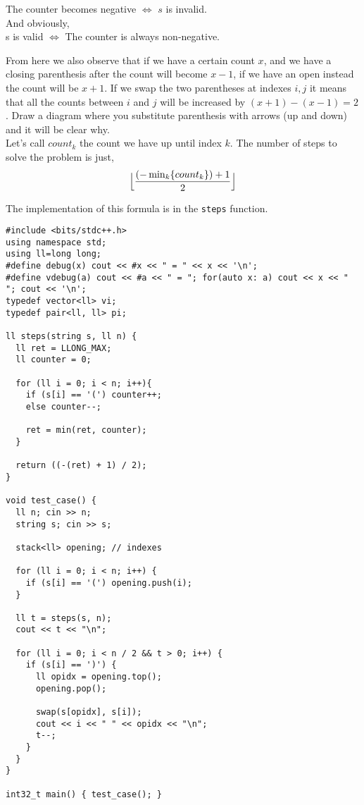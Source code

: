 \begin{obs}
    The counter becomes negative $\iff$ $s$ is invalid. \\
    And obviously, \\
    s is valid $\iff$ The counter is always non-negative.
\end{obs}

From here we also observe that if we have a certain count $x$, and we have a closing parenthesis after the count will become $x-1$, if we have an open instead the count will be $x + 1$. If we swap the two parentheses at indexes $i, j$ it means that all the counts between $i$ and $j$ will be increased by $(x + 1) - (x - 1)  = 2$. Draw a diagram where you substitute parenthesis with arrows (up and down) and it will be clear why.
\\
Let's call $count_k$ the count we have up until index $k$. The number of steps to solve the problem is just,
\begin{equation}
    \Bigl\lfloor \frac{ (- \min_{k}\{count_k\}) + 1}{2} \Bigr\rfloor
\end{equation}

The implementation of this formula is in the \texttt{steps} function.

\begin{verbatim}
#include <bits/stdc++.h>
using namespace std;
using ll=long long;
#define debug(x) cout << #x << " = " << x << '\n';
#define vdebug(a) cout << #a << " = "; for(auto x: a) cout << x << " "; cout << '\n';
typedef vector<ll> vi;
typedef pair<ll, ll> pi;

ll steps(string s, ll n) {
  ll ret = LLONG_MAX;
  ll counter = 0;

  for (ll i = 0; i < n; i++){
    if (s[i] == '(') counter++;
    else counter--;

    ret = min(ret, counter);
  }

  return ((-(ret) + 1) / 2);
}

void test_case() {
  ll n; cin >> n;
  string s; cin >> s;

  stack<ll> opening; // indexes

  for (ll i = 0; i < n; i++) {
    if (s[i] == '(') opening.push(i);
  }

  ll t = steps(s, n);
  cout << t << "\n";

  for (ll i = 0; i < n / 2 && t > 0; i++) {
    if (s[i] == ')') {
      ll opidx = opening.top();
      opening.pop();

      swap(s[opidx], s[i]);
      cout << i << " " << opidx << "\n";
      t--;
    }
  }
}

int32_t main() { test_case(); }
\end{verbatim}

